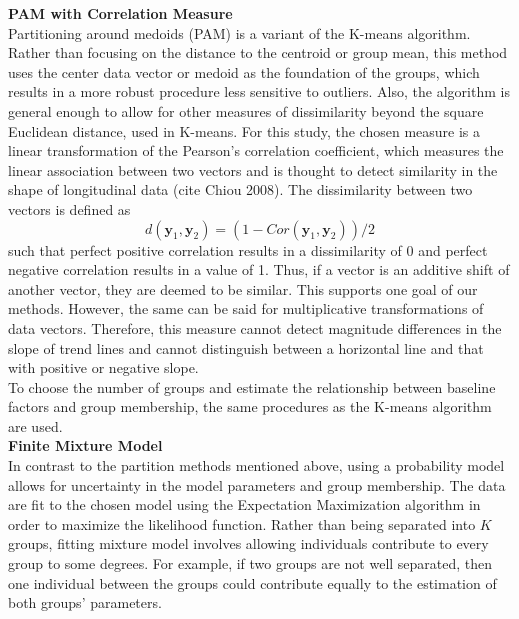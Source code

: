 \documentclass[12pt]{article}
\newcommand{\B}[0]{\mathbf}
\begin{document}
\textbf{PAM with Correlation Measure}\\
Partitioning around medoids (PAM) is a variant of the K-means algorithm. Rather than focusing on the distance to the centroid or group mean, this method uses the center data vector or medoid as the foundation of the groups, which results in a more robust procedure less sensitive to outliers. Also, the algorithm is general enough to allow for other measures of dissimilarity beyond the square Euclidean distance, used in K-means. For this study, the chosen measure is a linear transformation of the Pearson's correlation coefficient, which measures the linear association between two vectors and is thought to detect similarity in the shape of longitudinal data (cite Chiou 2008). The dissimilarity between two vectors is defined as
$$d(\B y_{1},\B y_{2}) = (1-Cor(\B y_{1},\B y_{2}))/2$$
such that perfect positive correlation results in a dissimilarity of 0 and perfect negative correlation results in a value of 1. Thus, if a vector is an additive shift of another vector, they are deemed to be similar. This supports one goal of our methods. However, the same can be said for multiplicative transformations of data vectors. Therefore, this measure cannot detect magnitude differences in the slope of trend lines and cannot distinguish between a horizontal line and that with positive or negative slope.\\

To choose the number of groups and estimate the relationship between baseline factors and group membership, the same procedures as the K-means algorithm are used.\\

\noindent \textbf{Finite Mixture Model}\\
In contrast to the partition methods mentioned above, using a probability model allows for uncertainty in the model parameters and group membership. The data are fit to the chosen model using the Expectation Maximization algorithm in order to maximize the likelihood function. Rather than being separated into $K$ groups, fitting mixture model involves allowing individuals contribute to every group to some degrees. For example, if two groups are not well separated, then one individual between the groups could contribute equally to the estimation of both groups' parameters. \\
\end{document}
